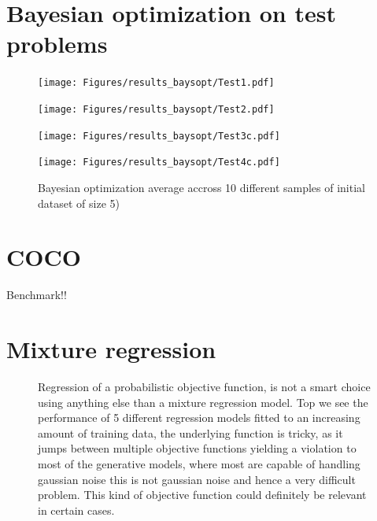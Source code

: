 \section{Bayesian optimization on test problems}

\begin{figure}[H]
  \centering
  \begin{minipage}[b]{0.49\textwidth}
   \texttt{[image: Figures/results\_baysopt/Test1.pdf]}
  \end{minipage}
  \hfill
  \begin{minipage}[b]{0.49\textwidth}
    \texttt{[image: Figures/results\_baysopt/Test2.pdf]}
   \end{minipage}
   \begin{minipage}[b]{0.49\textwidth}
    \texttt{[image: Figures/results\_baysopt/Test3c.pdf]}
   \end{minipage}
   \hfill
   \begin{minipage}[b]{0.49\textwidth}
     \texttt{[image: Figures/results\_baysopt/Test4c.pdf]}
    \end{minipage}
  \caption{Bayesian optimization average accross 10 different samples of initial dataset of size 5)}
  \label{Test_bayesOpt}
\end{figure}


\section{COCO}
Benchmark!!





\section{Mixture regression}

\begin{figure}
  \caption{Regression of a probabilistic objective function, is not a smart choice
  using anything else than a mixture regression model. Top we see the performance
  of 5 different regression models fitted to an increasing amount of training data, 
  the underlying function is tricky, as it jumps between multiple objective functions
  yielding a violation to most of the generative models, where most are capable of
  handling gaussian noise this is not gaussian noise and hence a very difficult problem. 
  This kind of objective function could definitely be relevant in certain cases.}
\end{figure}

